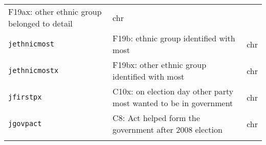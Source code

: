 \documentclass[]{article}
\begin{document}
\begin{longtable}[]{@{}lll@{}}
\begin{minipage}[t]{0.70\columnwidth}
F19ax: other ethnic group belonged to detail\strut
\end{minipage} & \begin{minipage}[t]{0.08\columnwidth}\raggedright\strut
chr\strut
\end{minipage}\tabularnewline
\begin{minipage}[t]{0.14\columnwidth}\raggedright\strut
\texttt{jethnicmost}\strut
\end{minipage} & \begin{minipage}[t]{0.70\columnwidth}\raggedright\strut
F19b: ethnic group identified with most\strut
\end{minipage} & \begin{minipage}[t]{0.08\columnwidth}\raggedright\strut
chr\strut
\end{minipage}\tabularnewline
\begin{minipage}[t]{0.14\columnwidth}\raggedright\strut
\texttt{jethnicmostx}\strut
\end{minipage} & \begin{minipage}[t]{0.70\columnwidth}\raggedright\strut
F19bx: other ethnic group identified with most\strut
\end{minipage} & \begin{minipage}[t]{0.08\columnwidth}\raggedright\strut
chr\strut
\end{minipage}\tabularnewline
\begin{minipage}[t]{0.14\columnwidth}\raggedright\strut
\texttt{jfirstpx}\strut
\end{minipage} & \begin{minipage}[t]{0.70\columnwidth}\raggedright\strut
C10x: on election day other party most wanted to be in government\strut
\end{minipage} & \begin{minipage}[t]{0.08\columnwidth}\raggedright\strut
chr\strut
\end{minipage}\tabularnewline
\begin{minipage}[t]{0.14\columnwidth}\raggedright\strut
\texttt{jgovpact}\strut
\end{minipage} & \begin{minipage}[t]{0.70\columnwidth}\raggedright\strut
C8: Act helped form the government after 2008 election\strut
\end{minipage} & \begin{minipage}[t]{0.08\columnwidth}\raggedright\strut
chr\strut
\end{minipage}\tabularnewline
\begin{minipage}[t]{0.14\columnwidth}\raggedright\strut

\end{minipage}
\end{longtable}
\end{document}
